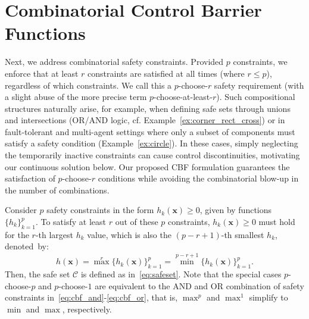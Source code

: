\documentclass[journal,twoside,web]{ieeecolor}
\newcommand{\Cc}{\mathcal{C}}
\theoremstyle{definition}
\newcommand{\bx}{\mathbf{x}}
\begin{document}
\section{Combinatorial Control Barrier Functions}
Next, we address combinatorial safety constraints.
Provided $p$ constraints, we enforce that at least $r$ constraints are satisfied at all times (where ${r \leq p}$), regardless of which constraints. We call this a $p$-choose-$r$ safety requirement (with a slight abuse of the more precise term $p$-choose-at-least-$r$). Such compositional structures naturally arise, for example, when defining safe sets through unions and intersections (OR/AND logic, cf. Example~\ref{ex:corner_rect_cross}) or in fault-tolerant and multi-agent settings where only a subset of components must satisfy a safety condition (Example~\ref{ex:circle}). In these cases, simply neglecting the temporarily inactive constraints can cause control discontinuities, motivating our continuous solution below.
Our proposed CBF formulation guarantees the satisfaction of $p$-choose-$r$ conditions while avoiding the combinatorial blow-up in the number of combinations.



Consider $p$ safety constraints in the form  ${h_k(\bx) \geq 0}$, given by functions $\{h_k\}_{k=1}^p$.
To satisfy at least $r$ out of these $p$ constraints, ${h_k(\bx) \geq 0}$ must hold for the $r$-th largest $h_k$ value, which is also the $(p-r+1)$-th smallest $h_k$, denoted~by:
\begin{equation}\label{eq:sorting_CBFs}
    h(\bx)  = \max^r \{h_k(\bx)\}_{k=1}^p = \min^{p-r+1} \{h_k(\bx)\}_{k=1}^p.
\end{equation}
Then, the safe set $\Cc$ is defined as in~\eqref{eq:safeset}.
Note that the special cases $p$-choose-$p$ and $p$-choose-$1$ are equivalent to the AND and OR combination of safety constraints in~\eqref{eq:cbf_and}-\eqref{eq:cbf_or}, that is, $\max^{p}$ and $\max^{1}$ simplify to $\min$ and $\max$, respectively.
\end{document}
